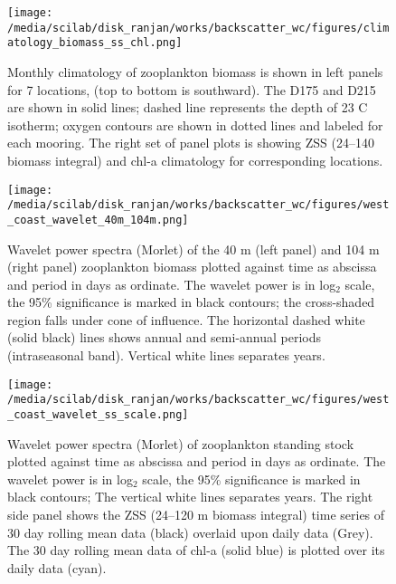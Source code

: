 \documentclass{article}
\begin{document}
\begin{figure}[htbp]
	\centering
	\texttt{[image: /media/scilab/disk\_ranjan/works/backscatter\_wc/figures/climatology\_biomass\_ss\_chl.png]} 
	\captionsetup{justification=justified,font=footnotesize,skip=0.05\baselineskip,width=\textwidth}
	\caption{Monthly climatology of zooplankton biomass is shown in left panels for 7 locations, (top to bottom is southward). The D175 and D215 are shown in solid lines; dashed line represents the depth of 23 C isotherm; oxygen contours are shown in dotted lines and labeled for each mooring. The right set of panel plots is showing ZSS (24--140 biomass integral) and chl-a climatology for corresponding locations.}
	\label{fig:zsschlclim}
\end{figure}



\begin{figure}[htbp]
	\centering
	\texttt{[image: /media/scilab/disk\_ranjan/works/backscatter\_wc/figures/west\_coast\_wavelet\_40m\_104m.png]} 
	\captionsetup{justification=justified,font=footnotesize,skip=0.05\baselineskip,width=\textwidth}
	\caption{Wavelet power spectra (Morlet) of the 40 m (left panel) and 104 m (right panel) zooplankton biomass plotted against time as abscissa and period in days as ordinate. The wavelet power is in log$_2$ scale, the 95\% significance is marked in black contours; the cross-shaded region falls under cone of influence. The horizontal dashed white (solid black) lines shows annual and semi-annual periods (intraseasonal band). Vertical white lines separates years.}
	\label{fig:wave40104}
\end{figure}


\begin{figure}[htbp]
	\centering
	\texttt{[image: /media/scilab/disk\_ranjan/works/backscatter\_wc/figures/west\_coast\_wavelet\_ss\_scale.png]} 
	\captionsetup{justification=justified,font=footnotesize,skip=0.05\baselineskip,width=\textwidth}
	\caption{Wavelet power spectra (Morlet) of zooplankton standing stock plotted against time as abscissa and period in days as ordinate. The wavelet power is in log$_2$ scale, the 95\% significance is marked in black contours; The vertical white lines separates years. The right side panel shows the ZSS (24--120 m biomass integral) time series of 30 day rolling mean data (black) overlaid upon daily data (Grey). The 30 day rolling mean data of chl-a (solid blue) is plotted over its daily data (cyan).}
	\label{fig:wavess}
\end{figure}
\end{document}
